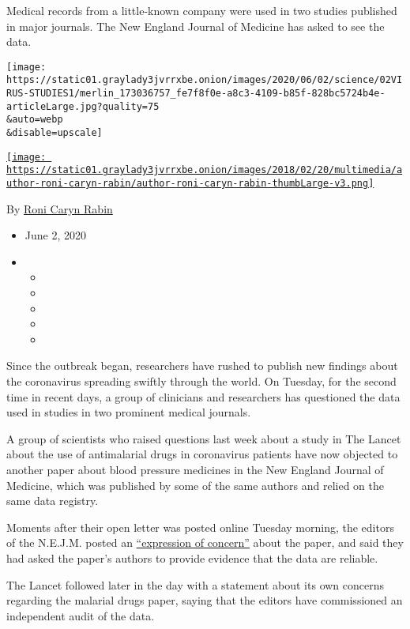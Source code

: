 Medical records from a little-known company were used in two studies
published in major journals. The New England Journal of Medicine has
asked to see the data.

\texttt{[image: https://static01.graylady3jvrrxbe.onion/images/2020/06/02/science/02VIRUS-STUDIES1/merlin\_173036757\_fe7f8f0e-a8c3-4109-b85f-828bc5724b4e-articleLarge.jpg?quality=75\\\&auto=webp\\\&disable=upscale]}

\href{https://www.nytimes3xbfgragh.onion/by/roni-caryn-rabin}{\texttt{[image: https://static01.graylady3jvrrxbe.onion/images/2018/02/20/multimedia/author-roni-caryn-rabin/author-roni-caryn-rabin-thumbLarge-v3.png]}}

By \href{https://www.nytimes3xbfgragh.onion/by/roni-caryn-rabin}{Roni
Caryn Rabin}

\begin{itemize}
\item
  June 2, 2020
\item
  \begin{itemize}
  \item
  \item
  \item
  \item
  \item
  \end{itemize}
\end{itemize}

Since the outbreak began, researchers have rushed to publish new
findings about the coronavirus spreading swiftly through the world. On
Tuesday, for the second time in recent days, a group of clinicians and
researchers has questioned the data used in studies in two prominent
medical journals.

A group of scientists who raised questions last week about a study in
The Lancet about the use of antimalarial drugs in coronavirus patients
have now objected to another paper about blood pressure medicines in the
New England Journal of Medicine, which was published by some of the same
authors and relied on the same data registry.

Moments after their open letter was posted online Tuesday morning, the
editors of the N.E.J.M. posted an
\href{https://www.nejm.org/doi/full/10.1056/NEJMe2020822}{``expression
of concern''} about the paper, and said they had asked the paper's
authors to provide evidence that the data are reliable.

The Lancet followed later in the day with a statement about its own
concerns regarding the malarial drugs paper, saying that the editors
have commissioned an independent audit of the data.

